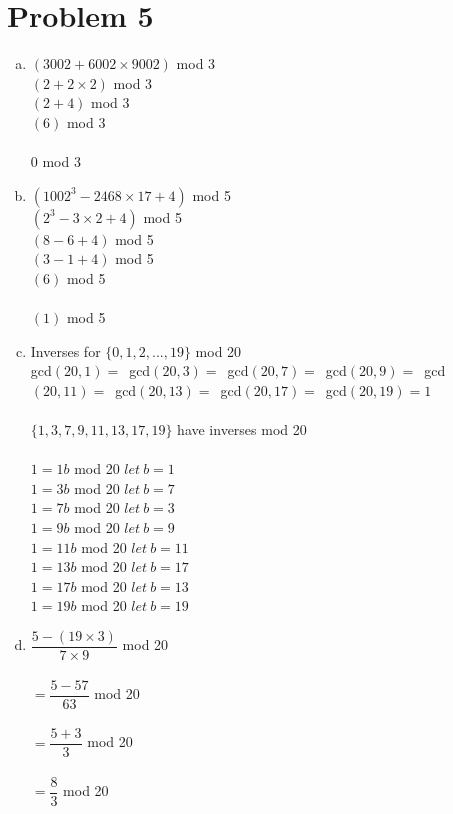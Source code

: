 \documentclass[11pt,letterpaper]{article}
\begin{document}
\section*{Problem 5}
\begin{enumerate}[(a)]
\item
$(3002+6002\times9002)$ mod 3\\
$(2+2\times2)$ mod 3\\
$(2+4)$ mod 3\\
$(6)$ mod 3\\
\\
$0$ mod 3\\
\item
$(1002^3-2468\times17+4)$ mod 5\\
$(2^3-3\times2+4)$ mod 5\\
$(8-6+4)$ mod 5\\
$(3-1+4)$ mod 5\\
$(6)$ mod 5\\
\\
$(1)$ mod 5\\
\item
Inverses for $\{0,1,2,... ,19\}$ mod 20\\
gcd$(20,1)=$\
gcd$(20,3)=$\
gcd$(20,7)=$\
gcd$(20,9)=$\
gcd$(20,11)=$\
gcd$(20,13)=$\
gcd$(20,17)=$\
gcd$(20,19)=1$\\
\\
$\{1,3,7,9,11,13,17,19\}$ have inverses mod 20\\
\\
$1 = 1b$ mod 20 $let~ b =1$\\
$1=3b$ mod 20 $let~ b =7$\\
$1=7b$ mod 20 $let~ b =3$\\
$1=9b$ mod 20 $let~ b =9$\\
$1=11b$ mod 20 $let~ b =11$\\
$1=13b$ mod 20 $let~ b =17$\\
$1=17b$ mod 20 $let~ b =13$\\
$1=19b$ mod 20 $let~ b =19$\\
\clearpage
\item
$\dfrac{5-(19\times3)}{7\times9}$ mod 20\\
\\
$=\dfrac{5-57}{63}$ mod 20\\
\\
$=\dfrac{5+3}{3}$ mod 20\\
\\
$=\dfrac{8}{3}$ mod 20\\
\\

\end{enumerate}
\end{document}
